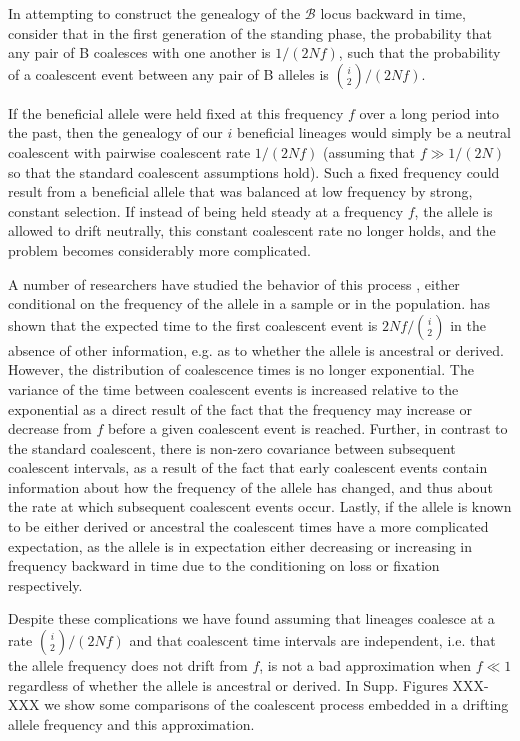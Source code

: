 \documentclass[a4paper,10pt]{article}
\newcommand{\fancyB}{$\mathcal B$ }
\begin{document}
In attempting to construct the genealogy of the \fancyB locus backward in time, consider that in the first generation of the standing phase, the probability that any pair of B coalesces with one another is $1/\left(2Nf\right)$, such that the probability of a coalescent event between any pair of B alleles is ${i \choose 2}/\left(2Nf\right)$. 


If the beneficial allele were held fixed at this frequency $f$ over a long period into the past, then the genealogy of our $i$ beneficial lineages would simply be a neutral coalescent with pairwise coalescent rate $1/(2 N f)$ (assuming that $f \gg 1/(2N)$ so that the standard coalescent assumptions hold). Such a fixed frequency could result from a beneficial allele that was balanced at low frequency by strong, constant selection. If instead of being held steady at a frequency $f$, the allele is allowed to drift neutrally, this constant coalescent rate no longer holds, and the problem becomes considerably more complicated.

A number of researchers have studied the behavior of this process \citep{XXXX}, either conditional on the frequency of the allele in a sample or in the population. \cite{Wiuf:2000js} has shown that the expected time to the first coalescent event is $2 N f/ {i \choose 2}$ in the absence of other information, e.g. as to whether the allele is ancestral or derived. However, the distribution of coalescence times is no longer exponential. The variance of the time between coalescent events is increased relative to the exponential as a direct result of the fact that the frequency may increase or decrease from $f$ before a given coalescent event is reached. Further, in contrast to the standard coalescent, there is non-zero covariance between subsequent coalescent intervals, as a result of the fact that early coalescent events contain information about how the frequency of the allele has changed, and thus about the rate at which subsequent coalescent events occur. Lastly, if the allele is known to be either derived or ancestral the coalescent times have a more complicated expectation, as the allele is in expectation either decreasing or increasing in frequency backward in time due to the conditioning on loss or fixation respectively.

Despite these complications we have found assuming that lineages coalesce at a rate $ {i \choose 2}/(2 N f)$ and that coalescent time intervals are independent, i.e. that the allele frequency does not drift from $f$, is not a bad approximation when $f \ll 1$ regardless of whether the allele is ancestral or derived. In Supp. Figures XXX-XXX we show some comparisons of the coalescent process embedded in a drifting allele frequency and this approximation. 
\end{document}
